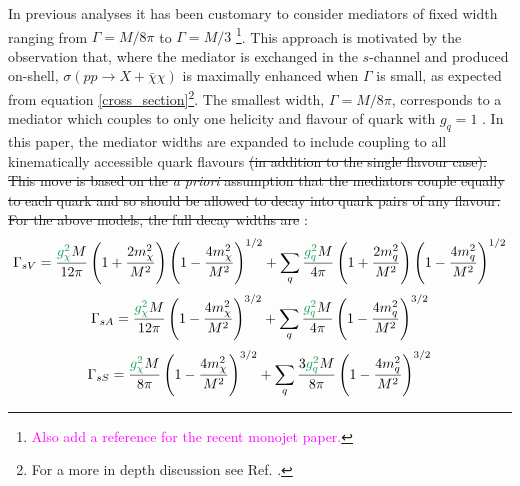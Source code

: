 \begin{flushleft}
 In previous analyses it has been customary to consider mediators of fixed width ranging from $\Gamma = M/8\pi$ to $\Gamma = M/3$ \cite{METSig, Fox:2012ee} \footnote{\textcolor{magenta}{Also add a reference for the recent monojet paper.}}. This approach is motivated by the observation that, where the mediator is exchanged in the $s$-channel and produced on-shell, $\sigma\left(pp \rightarrow X + \bar{\chi}\chi\right)$ is maximally enhanced when $\Gamma$ is small, as expected from equation \ref{cross_section}\footnote{For a more in depth discussion see Ref. \cite{METSig}.}. The smallest width, $\Gamma = M/8\pi$, corresponds to a mediator which couples  to only one helicity and flavour of quark with $g_{q} = 1$ \cite{METSig}. In this paper, the mediator widths are expanded to include coupling to all kinematically accessible quark flavours \st{(in addition to the single flavour case). This move is based on the \emph{a priori} assumption that the mediators couple equally to each quark and so should be allowed to decay into quark pairs of any flavour. For the above models, the full decay widths are} :
\begin{equation}
\label{gamma_sV}
\Gamma_{sV} = \frac{\fg{g_{\chi}^2} M}{12\pi}\left(1 + \frac{2m_{\chi}^{2}}{M^{2}}\right)\left(1 - \frac{4m_{\chi}^{2}}{M^{2}}\right)^{1/2} + \sum_{\substack{q}}\frac{\fg{g_q^2}M}{4\pi}\left(1 + \frac{2m_{q}^{2}}{M^{2}}\right)\left(1 - \frac{4m_{q}^{2}}{M^{2}}\right)^{1/2}
\end{equation}
\begin{equation}
\label{gamma_sA}
\Gamma_{sA} = \frac{\fg{g_{\chi}^2} M}{12\pi}\left(1 - \frac{4m_{\chi}^{2}}{M^{2}}\right)^{3/2} + \sum_{\substack{q}}\frac{\fg{g_q^2} M}{4\pi}\left(1 - \frac{4m_{q}^{2}}{M^{2}}\right)^{3/2}
\end{equation}
\begin{equation}
\label{gamma_sS}
\Gamma_{sS} = \frac{\fg{g_{\chi}^2} M}{8\pi}\left(1 - \frac{4m_{\chi}^{2}}{M^{2}}\right)^{3/2} + \sum_{\substack{q}}\frac{3\fg{g_q^2} M}{8\pi}\left(1 - \frac{4m_{q}^{2}}{M^{2}}\right)^{3/2}
\end{equation}

\end{flushleft}
